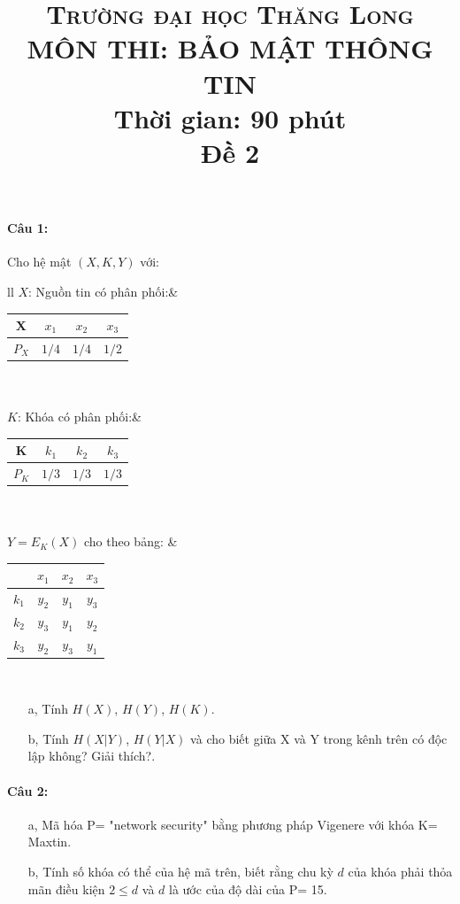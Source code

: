 \documentclass[paper=a4, fontsize=11pt]{scrartcl}
\title{
	\usefont{OT1}{bch}{b}{n}
	\normalfont \normalsize \textsc{Trường đại học Thăng Long} \\
	\Large MÔN THI: \textbf{BẢO MẬT THÔNG TIN}\\
	\Large Thời gian: \textbf{90 phút}\\
	Đề 2 
}
\date{}
\numberwithin{equation}{section}		%
\numberwithin{figure}{section}			%
\numberwithin{table}{section}				%
\begin{document}
	\maketitle
	
	\paragraph{Câu 1:} Cho hệ mật $(X, K, Y)$ với:\\
	\begin{tabular}{ll}
		$X$: Nguồn tin có phân phối:& 
		\begin{tabular}{|c|c|c|c|}
			\hline 
			X     & $x_1$ & $x_2$ & $x_3$\\
			\hline 
			$P_X$ & $1/4$ & $1/4$ & $1/2$\\
			\hline 
		\end{tabular} \\\\
		$K$: Khóa có phân phối:& 
		\begin{tabular}{|c|c|c|c|}
			\hline 
			K     & $k_1$ & $k_2$ & $k_3$\\
			\hline 
			$P_K$ & $1/3$ & $1/3$ & $1/3$\\
			\hline 
		\end{tabular} \\\\ 
		$Y= E_K(X)$ cho theo bảng:	
		&
		\begin{tabular}{|c|c|c|c|}
			\hline 
			& $x_1$ & $x_2$ & $x_3$\\
			\hline 
			$k_1$ & $y_2$      & $y_1$    & $y_3$    \\
			\hline 
			$k_2$ & $y_3$      & $y_1$    & $y_2$    \\
			\hline 
			$k_3$ & $y_2$      & $y_3$    & $y_1$   \\
			\hline 
		\end{tabular}\\
	\end{tabular} 
	
	\begin{itemize}
		\item[a,] Tính $H(X)$, $H(Y)$, $H(K)$.
		\item[b,] Tính $H(X|Y)$, $H(Y|X)$ và cho biết giữa X và Y trong kênh trên có độc lập không? Giải thích?.
	\end{itemize}	
	
	\paragraph{Câu 2:}
	\begin{itemize}
		\item[a,] Mã hóa P= "network security" bằng phương pháp Vigenere với khóa K= Maxtin.
		\item[b,] Tính số khóa có thể của hệ mã trên, biết rằng chu kỳ $d$ của khóa phải thỏa mãn điều kiện $2 \leq d$ và $d$ là ước của độ dài của P= 15.
	\end{itemize}
	
\end{document}

